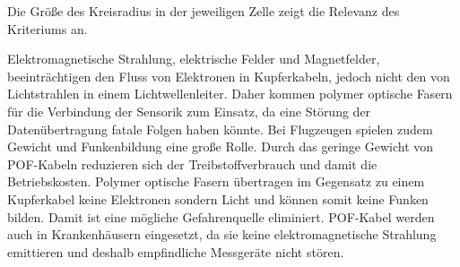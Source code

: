 
Die Größe des Kreisradius in der jeweiligen Zelle zeigt die Relevanz des
Kriteriums an.

Elektromagnetische Strahlung, elektrische Felder und Magnetfelder,
beeinträchtigen den Fluss von Elektronen in Kupferkabeln, jedoch nicht den von
Lichtstrahlen in einem Lichtwellenleiter. Daher kommen polymer optische Fasern
für die Verbindung der Sensorik zum Einsatz, da eine Störung der
Datenübertragung fatale Folgen haben könnte. Bei Flugzeugen spielen zudem
Gewicht und Funkenbildung eine große Rolle. Durch das geringe Gewicht von
POF-Kabeln reduzieren sich der Treibstoffverbrauch und damit die Betriebskosten.
Polymer optische Fasern übertragen im Gegensatz zu einem Kupferkabel keine
Elektronen sondern Licht und können somit keine Funken bilden. Damit ist eine
mögliche Gefahrenquelle eliminiert. POF-Kabel werden auch in Krankenhäusern
eingesetzt, da sie keine elektromagnetische Strahlung emittieren und deshalb
empfindliche Messgeräte nicht stören.
